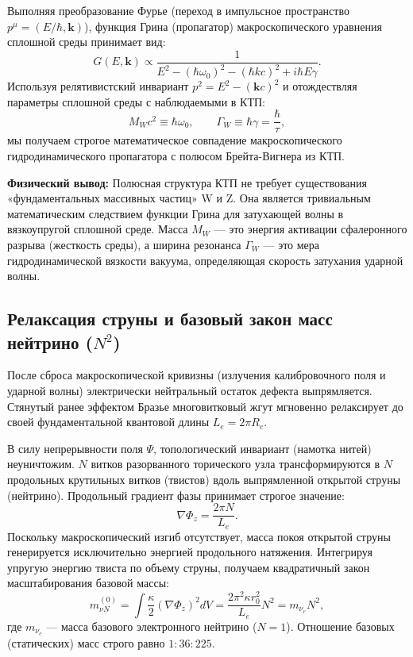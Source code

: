 \documentclass[12pt,a4paper]{article}
\begin{document}
Выполняя преобразование Фурье (переход в импульсное пространство $p^\mu = (E/\hbar, \mathbf{k})$), функция Грина (пропагатор) макроскопического уравнения сплошной среды принимает вид:
\begin{equation}
G(E, \mathbf{k}) \propto \frac{1}{E^2 - (\hbar\omega_0)^2 - (\hbar k c)^2 + i \hbar E \gamma}.
\end{equation}
Используя релятивистский инвариант $p^2 = E^2 - (\mathbf{k}c)^2$ и отождествляя параметры сплошной среды с наблюдаемыми в КТП:
\begin{equation}
M_W c^2 \equiv \hbar \omega_0, \qquad \Gamma_W \equiv \hbar \gamma = \frac{\hbar}{\tau},
\end{equation}
мы получаем строгое математическое совпадение макроскопического гидродинамического пропагатора с полюсом Брейта-Вигнера из КТП. 

\textbf{Физический вывод:} Полюсная структура КТП не требует существования «фундаментальных массивных частиц» W и Z. Она является тривиальным математическим следствием функции Грина для затухающей волны в вязкоупругой сплошной среде. Масса $M_W$ — это энергия активации сфалеронного разрыва (жесткость среды), а ширина резонанса $\Gamma_W$ — это мера гидродинамической вязкости вакуума, определяющая скорость затухания ударной волны. 
	
\subsection{Релаксация струны и базовый закон масс нейтрино ($N^2$)}
После сброса макроскопической кривизны (излучения калибровочного поля и ударной волны) электрически нейтральный остаток дефекта выпрямляется. Стянутый ранее эффектом Бразье многовитковый жгут мгновенно релаксирует до своей фундаментальной квантовой длины $L_e = 2\pi R_e$.
	
В силу непрерывности поля $\Psi$, топологический инвариант (намотка нитей) неуничтожим. $N$ витков разорванного торического узла трансформируются в $N$ продольных крутильных витков (твистов) вдоль выпрямленной открытой струны (нейтрино). Продольный градиент фазы принимает строгое значение:
\begin{equation}
\nabla \Phi_z = \frac{2\pi N}{L_e}.
\end{equation}
Поскольку макроскопический изгиб отсутствует, масса покоя открытой струны генерируется исключительно энергией продольного натяжения. Интегрируя упругую энергию твиста по объему струны, получаем квадратичный закон масштабирования базовой массы:
\begin{equation}
m_{\nu N}^{(0)} = \int \frac{\kappa}{2} (\nabla \Phi_z)^2 dV = \frac{2\pi^2 \kappa r_0^2}{L_e} N^2 = m_{\nu_e} N^2,
\label{eq:neutrino_n2}
\end{equation}
где $m_{\nu_e}$ — масса базового электронного нейтрино ($N=1$). Отношение базовых (статических) масс строго равно $1 : 36 : 225$.
	
\end{document}
